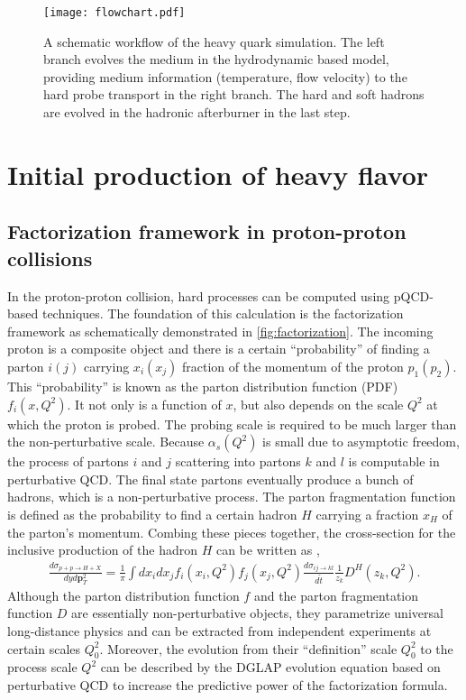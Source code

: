 \begin{figure}
\singlespacing
\centering
\texttt{[image: flowchart.pdf]}
\caption[A schematic workflow of the heavy quark simulation. The left]{A schematic workflow of the heavy quark simulation. The left branch evolves the medium in the hydrodynamic based model, providing medium information (temperature, flow velocity) to the hard probe transport in the right branch. The hard and soft hadrons are evolved in the hadronic afterburner in the last step.}
\label{fig:flowchart}
\end{figure}

\section{Initial production of heavy flavor}
\label{section:hard}
\subsection{Factorization framework in proton-proton collisions}
In the proton-proton collision, hard processes can be computed using pQCD-based techniques.
The foundation of this calculation is the factorization framework as schematically demonstrated in \ref{fig:factorization}.
The incoming proton is a composite object and there is a certain ``probability'' of finding a parton $i(j)$ carrying $x_i(x_j)$ fraction of the momentum of the proton $p_1(p_2)$.
This ``probability'' is known as the parton distribution function (PDF) $f_i(x, Q^2)$.
It not only is a function of $x$, but also depends on the scale $Q^2$ at which the proton is probed.
The probing scale is required to be much larger than the non-perturbative scale.
Because $\alpha_s(Q^2)$ is small due to asymptotic freedom, the process of partons $i$ and $j$ scattering into partons $k$ and $l$ is computable in perturbative QCD.
The final state partons eventually produce a bunch of hadrons, which is a non-perturbative process.
The parton fragmentation function is defined as the probability to find a certain hadron $H$ carrying a fraction $x_H$ of the parton's momentum.
Combing these pieces together, the cross-section for the inclusive production of the hadron $H$ can be written as \cite{Field:1989uq},
\begin{eqnarray}
\frac{d\sigma_{p+p\rightarrow H+X}}{dy d\mathbf{p}_T^2} = \frac{1}{\pi}\int dx_i dx_j f_i(x_i, Q^2) f_j(x_j, Q^2) \frac{d\sigma_{ij\rightarrow kl}}{d\hat{t}} \frac{1}{z_k}D^H(z_k, Q^2).
\end{eqnarray}
Although the parton distribution function $f$ and the parton fragmentation function $D$ are essentially non-perturbative objects, they parametrize universal long-distance physics and can be extracted from independent experiments at certain scales $Q_0^2$.
Moreover, the evolution from their ``definition'' scale $Q_0^2$ to the process scale $Q^2$ can be described by the DGLAP evolution equation \cite{Gribov:1972ri,Altarelli:1977zs,Dokshitzer:1977sg} based on perturbative QCD to increase the predictive power of the factorization formula.

